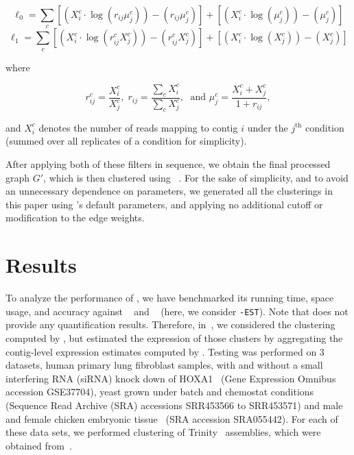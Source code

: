 \begin{equation}
\ell_0 = \sum_{c} \left[\left(X_i^{c} \cdot \log\left(r_{ij} \mu_j^{c}\right)\right) - \left(r_{ij} \mu_j^{c}\right)\right] + \left[\left(X_i^{c} \cdot \log\left(\mu_j^{c}\right)\right) - \left(\mu_j^{c}\right)\right]
\label{eqn:likelihood_null}
\end{equation}
\begin{equation}
\ell_1 = \sum_{c} \left[\left(X_i^{c} \cdot \log\left(r_{ij}^{c} X_j^{c}\right)\right) - \left(r_{ij}^{c} X_j^{c}\right)\right] + \left[\left(X_i^{c} \cdot \log\left(X_j^{c}\right)\right) - \left(X_j^{c}\right)\right]
\label{eqn:likelihood_alt}
\end{equation}

where

$$r_{ij}^{c} = \frac{X_i^{c}}{X_j^{c}},\; r_{ij} = \frac{\sum_{c}X_i^{c}}{\sum_{c}X_j^{c}},\; \text{ and } \mu_{j}^{c} = \frac{X_{i}^{c} + X_{j}^{c}}{1 + r_{ij}},$$

and $X_i^{c}$ denotes the number of reads mapping to contig $i$ under the $j^{\text{th}}$ condition (summed over all replicates of a condition for simplicity).

After applying both of these filters in sequence, we obtain the final processed graph $G'$, which is then clustered using \mcl~\cite{mcl}.  For the sake of simplicity, and to avoid an unnecessary dependence on parameters, we generated all the clusterings in this paper using \mcl's default parameters, and applying no additional cutoff or modification to the edge weights. 


\section{Results}
To analyze the performance of \rapclust, we have benchmarked its running time, space usage, and accuracy against \corset~\citep{corset} and \cdhit~\citep{cdhit,cdhit2} (here, we consider \cdhit\texttt{-EST}). Note that \cdhit does not provide any quantification results.  Therefore, in~, we considered the clustering computed by \cdhit, but estimated the expression of those clusters by aggregating the contig-level expression estimates computed by \sailfish.  Testing was performed on 3 datasets, human primary lung fibroblast samples, with and without a small interfering RNA (siRNA) knock down of HOXA1~\citep{humandata} (Gene Expression Omnibus accession GSE37704), yeast grown under batch and chemostat conditions~\citep{yeastdata} (Sequence Read Archive (SRA) accessions SRR453566 to SRR453571) and male and female chicken embryonic tissue~\citep{chickendata} (SRA accession SRA055442). For each of these data sets, we performed clustering of Trinity~\citep{trinity} \denovo assemblies, which were obtained from~\citep{corset_data}.

